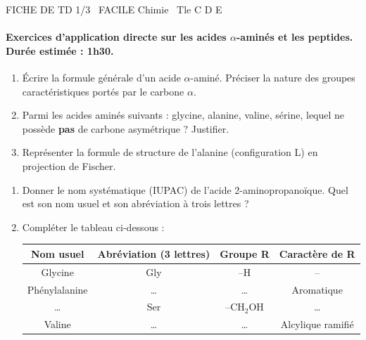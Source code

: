 \documentclass[11pt]{article}
\begin{document}
\begin{tcolorbox}[enhanced,colback=popink,colframe=popink,arc=10pt,boxrule=0pt,left=12pt,right=12pt,top=9pt,bottom=9pt]
{\color{white}\popxbold\small FICHE DE TD 1/3 \textbullet\ FACILE \hfill Chimie \textbullet\ Tle C D E\par}
\end{tcolorbox}
\vspace{4pt}
\paragraph{Exercices d'application directe sur les acides $\alpha$-aminés et les peptides. Durée estimée : 1h30.}

\begin{exercice}
\begin{enumerate}
    \item Écrire la formule générale d'un acide $\alpha$-aminé. Préciser la nature des groupes caractéristiques portés par le carbone $\alpha$.
    \item Parmi les acides aminés suivants : glycine, alanine, valine, sérine, lequel ne possède \textbf{pas} de carbone asymétrique ? Justifier.
    \item Représenter la formule de structure de l'alanine (configuration L) en projection de Fischer.
\end{enumerate}
\end{exercice}

\begin{exercice}
\begin{enumerate}
    \item Donner le nom systématique (IUPAC) de l'acide 2-aminopropanoïque. Quel est son nom usuel et son abréviation à trois lettres ?
    \item Compléter le tableau ci-dessous :
    \begin{center}
    \begin{tabular}{|c|c|c|c|}
    \hline
    \textbf{Nom usuel} & \textbf{Abréviation (3 lettres)} & \textbf{Groupe R} & \textbf{Caractère de R} \\ \hline
    Glycine & Gly & --H & -- \\ \hline
    Phénylalanine & \dots & \dots & Aromatique \\ \hline
    \dots & Ser & --CH$_2$OH & \dots \\ \hline
    Valine & \dots & \dots & Alcylique ramifié \\ \hline
    \end{tabular}
    \end{center}
\end{enumerate}
\end{exercice}
\end{document}
